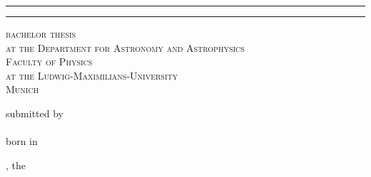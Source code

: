 \begin{titlepage}   

   {\sffamily
    {\parindent0cm
    \rule{\linewidth}{.7ex}}  
  \begin{center}
    {\Huge \bfseries \getTitle{}}
    
    \vspace*{2ex}
    {\Large \bfseries \getSubtitle{}}
    
    {\large\bfseries \getAuthor{}}
    
  \end{center}
    \rule{\linewidth}{.7ex}
    
  \begin{center}
    {\large \scshape bachelor thesis\\
     at the Department for Astronomy and Astrophysics\\
     Faculty of Physics\\
     at the Ludwig-Maximilians-University\\
     Munich
     
     submitted by\\
     \getAuthor{}\\
     born in \getPlaceOfBirth{}
     
     \getPrintLocation{}, the \getSubmissionDate{}
     }
  \end{center}
  
  \AddToShipoutPicture*{\BackgroundPic}
   }
\end{titlepage}
